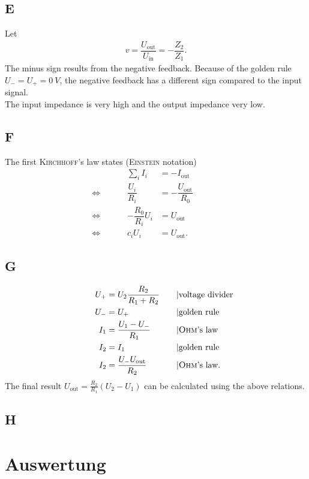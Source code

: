 \documentclass[a4paper,10pt]{article}
\numberwithin{equation}{section}
\begin{document}
\begin{multicols}{2}
        \subsection{E}
        Let
        \begin{align} 
                v=\dfrac{U_\text{out}}{U_\text{in}}=-\dfrac{Z_2}{Z_1}
        .\end{align} 
        The minus sign results from the negative feedback.
        Because of the golden rule $U_-=U_+=\SI{0}{V}$, the negative feedback has a different sign compared to the input signal.
        \\\indent The input impedance is very high and the output impedance very low. 

        \subsection{F}
        The first \textsc{Kirchhoff}'s law states (\textsc{Einstein} notation)
        \begin{align} 
                &&&& \sum_{i}^{}I_i &= -I_\text{out} &&&& \\
                \Leftrightarrow  &&&& \dfrac{U_i}{R_i} &= -\dfrac{U_\text{out}}{R_0}&&&& \\
                \Leftrightarrow  &&&& -\dfrac{R_0}{R_i}U_i &= U_\text{out} &&&& \\
                \Leftrightarrow  &&&& c_iU_i &= U_\text{out}. &&&& 
        \end{align} 
        
        \subsection{G}
        \begin{align} 
                &&&& U_+ &= U_2\dfrac{R_2}{R_1+R_2} &&&& |\text{voltage divider}\\
                &&&& U_- &= U_+ &&&& |\text{golden rule}\\
                &&&& I_1 &= \dfrac{U_1-U_-}{R_1} &&&& |\text{\textsc{Ohm}'s law}\\
                &&&& I_2 &= I_1 &&&& |\text{golden rule}\\
                &&&& I_2 &= \dfrac{U_-U_\text{out}}{R_2} &&&& |\text{\textsc{Ohm}'s law}
        .\end{align}
        The final result $U_\text{out}=\tfrac{R_2}{R_1}\left(U_2-U_1\right)$ can be calculated using the above relations.

        \subsection{H}

        \newpage
        \section{Auswertung}
\end{multicols}

\clearpage
\listoffigures
\listoftables



\end{document}
